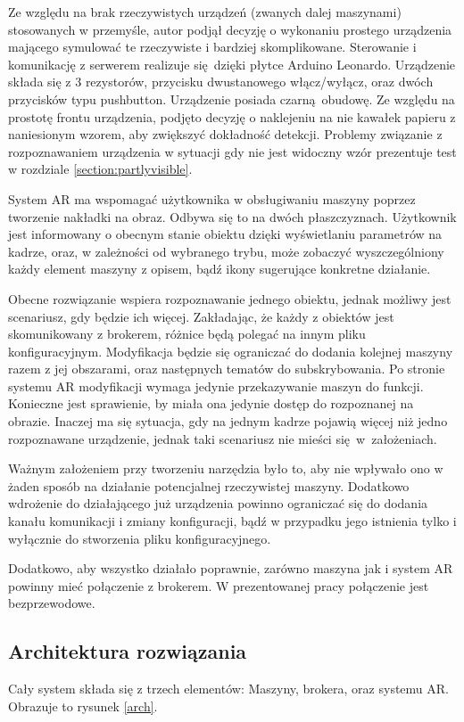 \documentclass[12pt,twoside,polish]{article}
\begin{document}
Ze względu na brak rzeczywistych urządzeń (zwanych dalej maszynami) stosowanych w przemyśle, autor podjął decyzję o wykonaniu prostego urządzenia mającego symulować te rzeczywiste i bardziej skomplikowane. Sterowanie i komunikację z serwerem realizuje się dzięki płytce Arduino Leonardo. Urządzenie składa się z 3 rezystorów, przycisku dwustanowego włącz/wyłącz, oraz dwóch przycisków typu pushbutton. Urządzenie posiada czarną obudowę. Ze względu na prostotę frontu urządzenia, podjęto decyzję o naklejeniu na nie kawałek papieru z naniesionym wzorem, aby zwiększyć dokładność detekcji. Problemy związanie z rozpoznawaniem urządzenia w sytuacji gdy nie jest widoczny wzór prezentuje test w rozdziale \ref{section:partlyvisible}.

System AR ma wspomagać użytkownika w obsługiwaniu maszyny poprzez tworzenie nakładki na obraz. Odbywa się to na dwóch płaszczyznach. Użytkownik jest informowany o obecnym stanie obiektu dzięki wyświetlaniu parametrów na kadrze, oraz, w zależności od wybranego trybu, może zobaczyć wyszczególniony każdy element maszyny z opisem, bądź ikony sugerujące konkretne działanie.

Obecne rozwiązanie wspiera rozpoznawanie jednego obiektu, jednak możliwy jest scenariusz, gdy będzie ich więcej. Zakładając, że każdy z obiektów jest skomunikowany z brokerem, różnice będą polegać na innym pliku konfiguracyjnym. Modyfikacja będzie się ograniczać do dodania kolejnej maszyny razem z jej obszarami, oraz następnych tematów do subskrybowania. Po stronie systemu AR modyfikacji wymaga jedynie przekazywanie maszyn do funkcji. Konieczne jest sprawienie, by miała ona jedynie dostęp do rozpoznanej na obrazie. Inaczej ma się sytuacja, gdy na jednym kadrze pojawią więcej niż jedno rozpoznawane urządzenie, jednak taki scenariusz nie mieści się w~założeniach.

Ważnym założeniem przy tworzeniu narzędzia było to, aby nie wpływało ono w żaden sposób na działanie potencjalnej rzeczywistej maszyny. Dodatkowo wdrożenie do działającego już urządzenia powinno ograniczać się do dodania kanału komunikacji i zmiany konfiguracji, bądź w przypadku jego istnienia tylko i wyłącznie do stworzenia pliku konfiguracyjnego.

Dodatkowo, aby wszystko działało poprawnie, zarówno maszyna jak i system AR powinny mieć połączenie z brokerem. W prezentowanej pracy połączenie jest bezprzewodowe.

\subsection{Architektura rozwiązania}
Cały system składa się z trzech elementów: Maszyny, brokera, oraz systemu AR. Obrazuje to rysunek \ref{arch}.
\end{document}
